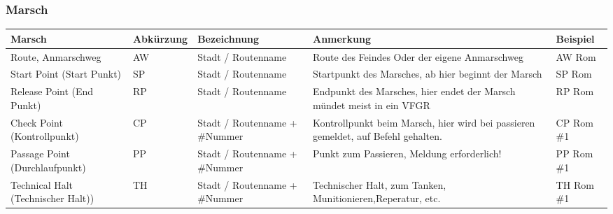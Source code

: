 \subsubsection{Marsch}
\begin{longtable}{|p{3cm}|p{}|p{}|p{4cm}|p{}|} 																											\hline
	Marsch			&		Abkürzung			&		Bezeichnung				&			Anmerkung 									&		Beispiel 			\\ \hline
	Route, Anmarschweg	&		AW				&		Stadt / Routenname		&			Route des Feindes Oder der eigene Anmarschweg			&		AW Rom			\\ \hline
	Start Point (Start Punkt)	&		SP				&		Stadt / Routenname		&			Startpunkt des Marsches, ab hier beginnt der Marsch			&		SP Rom			\\ \hline
	Release Point (End Punkt)	&		RP				&		Stadt / Routenname		&			Endpunkt des Marsches, hier endet der Marsch mündet meist in ein VFGR	&	RP Rom			\\ \hline
	Check Point (Kontrollpunkt)	&	CP				&		Stadt / Routenname  + \#Nummer	&		Kontrollpunkt beim Marsch, hier wird bei passieren gemeldet, auf Befehl gehalten. &	CP Rom \#1		\\ \hline
	Passage Point (Durchlaufpunkt)	&	PP				&		Stadt / Routenname  + \#Nummer	&		Punkt zum Passieren, Meldung erforderlich!				&		PP Rom \#1	 		\\ \hline
	Technical Halt (Technischer Halt)) &	TH				&		Stadt / Routenname  + \#Nummer	&		Technischer Halt, zum Tanken, Munitionieren,Reperatur, etc.	&		TH Rom \#1			\\ \hline	
\end{longtable}